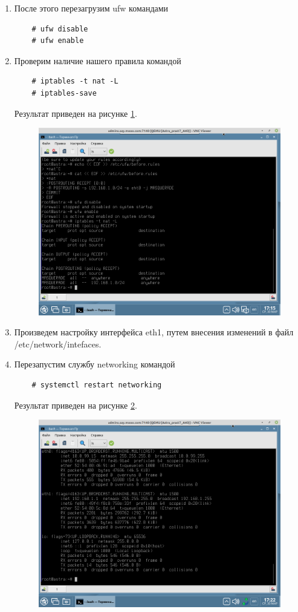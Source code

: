 \documentclass[a4paper,14pt]{extarticle}
\begin{document}
\begin{enumerate}
	\item После этого перезагрузим ufw командами 
	\begin{lstlisting}
	# ufw disable
	# ufw enable\end{lstlisting}
	
	\item Проверим наличие нашего правила командой
	
	\begin{lstlisting}
	# iptables -t nat -L
	# iptables-save \end{lstlisting}
	
	Результат приведен на рисунке \ref{fig:---2022-03-30-17-15-28}.
	
\begin{figure}[h!]
	\centering
	\includegraphics[width=0.5\linewidth]{"images/Снимок экрана от 2022-03-30 17-15-28"}
	\caption{}
	\label{fig:---2022-03-30-17-15-28}
\end{figure}
	
	\item Произведем настройку интерфейса eth1, путем внесения изменений в файл /etc/network/intefaces.
	
	\item Перезапустим службу networking командой
	
	\begin{lstlisting}
	# systemctl restart networking\end{lstlisting}
	
	
	Результат приведен на рисунке \ref{fig:---2022-03-30-17-22-22}.
\begin{figure}[h!]
	\centering
	\includegraphics[width=0.5\linewidth]{"images/Снимок экрана от 2022-03-30 17-22-22"}
	\caption{}
	\label{fig:---2022-03-30-17-22-22}
\end{figure}


\end{enumerate}
\end{document}
